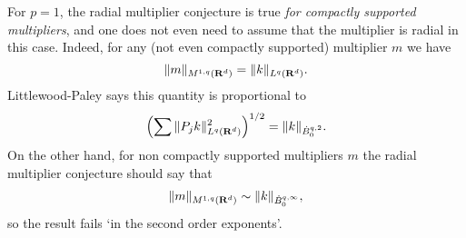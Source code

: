 \begin{remark}
    For $p = 1$, the radial multiplier conjecture is true \emph{for compactly supported multipliers}, and one does not even need to assume that the multiplier is radial in this case. Indeed, for any (not even compactly supported) multiplier $m$ we have
    \[ \| m \|_{M^{1,q}(\operatorname{\mathbf{R}}^d)} = \| k \|_{L^q(\operatorname{\mathbf{R}}^d)}. \]
    Littlewood-Paley says this quantity is proportional to
    \[ \left( \sum \| P_j k \|_{L^q(\operatorname{\mathbf{R}}^d)}^2 \right)^{1/2} = \| k \|_{\dot{B}^{q,2}_0}. \]
    On the other hand, for non compactly supported multipliers $m$ the radial multiplier conjecture should say that
    \[ \| m \|_{M^{1,q}(\operatorname{\mathbf{R}}^d)} \sim \| k \|_{\dot{B}^{q,\infty}_0}, \]
    so the result fails `in the second order exponents'.

\end{remark}




